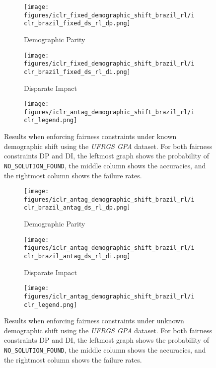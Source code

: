 \begin{figure}[ht]
    \begin{subfigure}{\linewidth}
      \centering
      \texttt{[image: figures/iclr\_fixed\_demographic\_shift\_brazil\_rl/iclr\_brazil\_fixed\_ds\_rl\_dp.png]}
      \caption{Demographic Parity}
      \label{fig:brazil_k_dp}
    \end{subfigure}
    \begin{subfigure}{\linewidth}
      \centering
      \texttt{[image: figures/iclr\_fixed\_demographic\_shift\_brazil\_rl/iclr\_brazil\_fixed\_ds\_rl\_di.png]}
      \caption{Disparate Impact}
      \label{fig:brazil_k_di}
    \end{subfigure}
    \begin{subfigure}{\textwidth}
        \texttt{[image: figures/iclr\_antag\_demographic\_shift\_brazil\_rl/iclr\_legend.png]}
    \end{subfigure}
    
    \caption{Results when enforcing fairness constraints under known demographic shift using the \textit{UFRGS GPA} dataset. For both fairness constraints DP and DI, the leftmost graph shows the probability of \texttt{NO\_SOLUTION\_FOUND}, the middle column shows the accuracies, and the rightmost column shows the failure rates.}
    \label{fig:brazil_k_shift}
\end{figure}



\begin{figure}[ht]
    \begin{subfigure}{\linewidth}
      \centering
      \texttt{[image: figures/iclr\_antag\_demographic\_shift\_brazil\_rl/iclr\_brazil\_antag\_ds\_rl\_dp.png]}
      \caption{Demographic Parity}
      \label{fig:brazil_unk_dp}
    \end{subfigure}
    \begin{subfigure}{\linewidth}
      \centering
      \texttt{[image: figures/iclr\_antag\_demographic\_shift\_brazil\_rl/iclr\_brazil\_antag\_ds\_rl\_di.png]}
      \caption{Disparate Impact}
      \label{fig:brazil_unk_di}
    \end{subfigure}
    \begin{subfigure}{\textwidth}
    \texttt{[image: figures/iclr\_antag\_demographic\_shift\_brazil\_rl/iclr\_legend.png]}
    \end{subfigure}
    
    \caption{Results when enforcing fairness constraints under unknown demographic shift using the \textit{UFRGS GPA} dataset. For both fairness constraints DP and DI, the leftmost graph shows the probability of \texttt{NO\_SOLUTION\_FOUND}, the middle column shows the accuracies, and the rightmost column shows the failure rates.} 
    \label{fig:brazil_unk_shift}
\end{figure}

